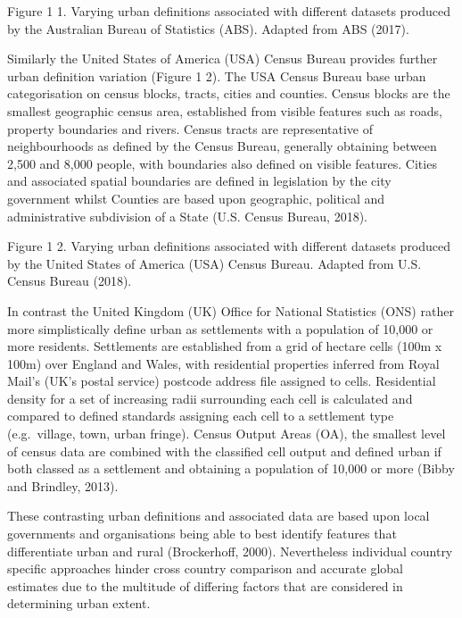 \documentclass[]{book}
\begin{document}
Figure 1 1. Varying urban definitions associated with different datasets
produced by the Australian Bureau of Statistics (ABS). Adapted from ABS
(2017).

Similarly the United States of America (USA) Census Bureau provides
further urban definition variation (Figure 1 2). The USA Census Bureau
base urban categorisation on census blocks, tracts, cities and counties.
Census blocks are the smallest geographic census area, established from
visible features such as roads, property boundaries and rivers. Census
tracts are representative of neighbourhoods as defined by the Census
Bureau, generally obtaining between 2,500 and 8,000 people, with
boundaries also defined on visible features. Cities and associated
spatial boundaries are defined in legislation by the city government
whilst Counties are based upon geographic, political and administrative
subdivision of a State (U.S. Census Bureau, 2018).

Figure 1 2. Varying urban definitions associated with different datasets
produced by the United States of America (USA) Census Bureau. Adapted
from U.S. Census Bureau (2018).

In contrast the United Kingdom (UK) Office for National Statistics (ONS)
rather more simplistically define urban as settlements with a population
of 10,000 or more residents. Settlements are established from a grid of
hectare cells (100m x 100m) over England and Wales, with residential
properties inferred from Royal Mail's (UK's postal service) postcode
address file assigned to cells. Residential density for a set of
increasing radii surrounding each cell is calculated and compared to
defined standards assigning each cell to a settlement type
(e.g.~village, town, urban fringe). Census Output Areas (OA), the
smallest level of census data are combined with the classified cell
output and defined urban if both classed as a settlement and obtaining a
population of 10,000 or more (Bibby and Brindley, 2013).

These contrasting urban definitions and associated data are based upon
local governments and organisations being able to best identify features
that differentiate urban and rural (Brockerhoff, 2000). Nevertheless
individual country specific approaches hinder cross country comparison
and accurate global estimates due to the multitude of differing factors
that are considered in determining urban extent.
\end{document}
